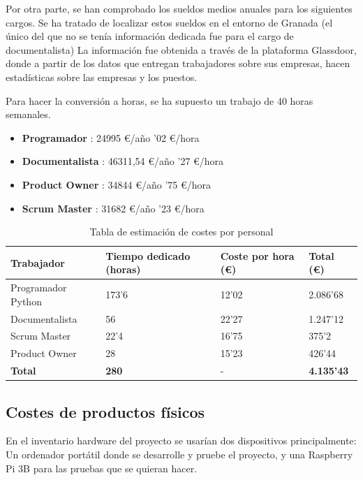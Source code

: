 Por otra parte, se han comprobado los sueldos medios anuales para los siguientes cargos. Se ha tratado de localizar estos sueldos en el entorno de Granada (el único del que no se tenía información dedicada fue para el cargo de documentalista) La información fue obtenida a través de la plataforma Glassdoor, donde a partir de los datos que entregan trabajadores sobre sus empresas, hacen estadísticas sobre las empresas y los puestos.

Para hacer la conversión a horas, se ha supuesto un trabajo de 40 horas semanales.
\begin{itemize}
	\item \textbf{Programador} \cite{glassdoor-softwaredeveloper}: 24995 €/año '02 €/hora
	\item \textbf{Documentalista} \cite{glassdoor-documentalist}: 46311,54 €/año '27 €/hora
	\item \textbf{Product Owner} \cite{glassdoor-productowner}: 34844 €/año '75 €/hora
	\item \textbf{Scrum Master} \cite{glassdoor-ScrumMaster}: 31682 €/año '23 €/hora
\end{itemize}

\begin{center}
	\begin{table}[H]
		\centering
		\begin{tabularx}{\textwidth}{|X|X|X|X|}
			\hline
			\cellcolor{lightblue}\textbf{Trabajador} & \cellcolor{lightblue}\textbf{Tiempo dedicado (horas)} & \cellcolor{lightblue}\textbf{Coste por hora (€)} & \cellcolor{lightblue}\textbf{Total (€)} \\
			\hline
			Programador Python & 173'6 & 12'02 & 2.086'68  \\
			\hline
			Documentalista & 56 & 22'27 & 1.247'12 \\
			\hline
			Scrum Master & 22'4 & 16'75 & 375'2 \\
			\hline
			Product Owner & 28 & 15'23 & 426'44 \\
			\hline
			\textbf{Total} & \textbf{280} & - & \textbf{4.135'43} \\
			\hline
		\end{tabularx}
		\caption{Tabla de estimación de costes por personal}
	\end{table}
\end{center}
	
\subsection {Costes de productos físicos}
En el inventario hardware del proyecto se usarían dos dispositivos principalmente: Un ordenador portátil donde se desarrolle y pruebe el proyecto, y una Raspberry Pi 3B para las pruebas que se quieran hacer.

